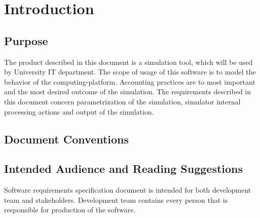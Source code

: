 
\chapter{Introduction}

\section{Purpose}
	\begin{comment}
	$<$Identify the product whose software requirements are specified in this 
	document, including the revision or release number. Describe the scope of the 
	product that is covered by this SRS, particularly if this SRS describes only 
	part of the system or a single subsystem.$>$
	\end{comment}
	The product described in this document is a simulation tool, which will be used by University IT department. The scope of usage of this software is to model the behavior of the \gls{computing-platform}. Accounting practices are to most important and the most desired outcome of the simulation. The requirements described in this document concern parametrization of the simulation, simulator internal processing actions and output of the simulation.
\section{Document Conventions}
	\begin{comment}
		$<$Describe any standards or typographical conventions that were followed when 
		writing this SRS, such as fonts or highlighting that have special significance.  
		For example, state whether priorities  for higher-level requirements are assumed 
		to be inherited by detailed requirements, or whether every requirement statement 
		is to have its own priority.$>$
	\end{comment}
\section{Intended Audience and Reading Suggestions}
	\begin{comment}
		$<$Describe the different types of reader that the document is intended for, 
		such as developers, project managers, marketing staff, users, testers, and 
		documentation writers. Describe what the rest of this SRS contains and how it is 
		organized. Suggest a sequence for reading the document, beginning with the 
		overview sections and proceeding through the sections that are most pertinent to 
		each reader type.$>$
	\end{comment}
	Software requirements specification document is intended for both development team and stakeholders. Development team contains every person that is responsible for production of the software.
	
